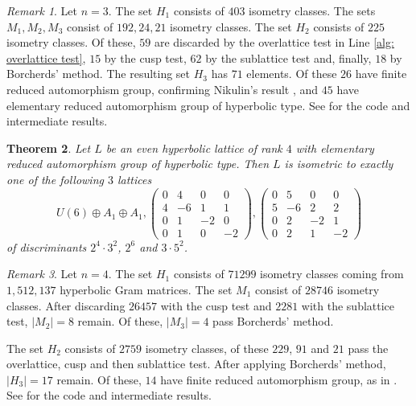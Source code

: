 \documentclass[11pt,letterpaper]{amsart}
\newtheorem{theorem}{Theorem}[section]
\theoremstyle{definition}
\theoremstyle{remark}
\newtheorem{remark}[theorem]{Remark}
\begin{document}
\begin{remark}
Let $n=3$. The set $H_1$ consists of $403$ isometry classes.
The sets $M_1,M_2,M_3$ consist of $192,24,21$ isometry classes.
The set $H_2$ consists of $225$ isometry classes. 
Of these, $59$ are discarded by the overlattice test in Line \ref{alg: overlattice test}, $15$ by the cusp test, $62$ by the sublattice test and, finally, $18$ by Borcherds' method.
The resulting set $H_3$ has $71$ elements. Of these $26$ have finite reduced automorphism group, confirming Nikulin's result \cite{nikulin.finite.aut.3}, and $45$ have elementary reduced automorphism group of hyperbolic type. See \cite{intermediate.data} for the code and intermediate results.
\end{remark}

\begin{theorem} \label{thm:classification.4}
Let $L$ be an even hyperbolic lattice of rank $4$ with elementary reduced automorphism group of hyperbolic type. 
Then $L$ is isometric to exactly one of the following $3$ lattices
\[U(6) \oplus A_1 \oplus A_1, 
\begin{pmatrix} 
0 & 4 & 0 & 0\\
 4 & -6 & 1 & 1\\
 0 & 1 & -2 & 0\\
 0 & 1 & 0 & -2
\end{pmatrix},
\begin{pmatrix} 
0 & 5 & 0 & 0\\
 5 & -6 & 2 & 2\\
 0 & 2 & -2 & 1\\
 0 & 2 & 1 & -2
\end{pmatrix}
\]
of discriminants $2^4 \cdot 3^2$, $2^6$ and $3 \cdot 5^2$.
\end{theorem} 
\begin{remark}
Let $n=4$. 
The set $H_1$ consists of $71299$ isometry classes coming from $1,512,137$ hyperbolic Gram matrices.  
The set $M_1$ consist of $28746$ isometry classes. After discarding $26457$ with the cusp test and $2281$ with the sublattice test, $|M_2|=8$ remain. Of these, $|M_3|=4$ pass Borcherds' method. 

The set $H_2$ consists of $2759$ isometry classes,
of these $229$, $91$ and $21$ pass the overlattice, cusp and then sublattice test. After applying Borcherds' method, $|H_3|=17$ remain. Of these, $14$ have finite reduced automorphism group, as in \cite{vinberg.finite.aut.4}. See \cite{intermediate.data} for the code and intermediate results.
\end{remark}
\end{document}

